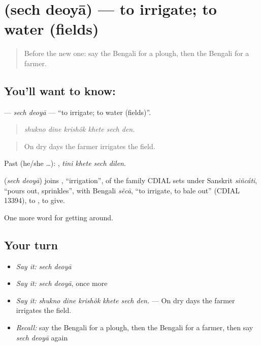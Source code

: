 \section[\texorpdfstring{\bn{সেচ} \bn{দেওয়া} (sech deoyā)}{সেচ দেওয়া (sech deoyā)}]{  (sech deoyā) — to irrigate; to water (fields)}

\label{lesson:BN-C430-sech-deoya}



\begin{quote}
Before the new one: say the Bengali for a plough, then the Bengali for a farmer.
\end{quote}

\subsection*{You'll want to know:  }
\textbf{ } — \emph{sech deoyā} — \textquotedblleft{}to irrigate; to water (fields)\textquotedblright{}.

\begin{quote}
     
\end{quote}

\begin{quote}
\emph{shukno dine krishôk khete sech den.}
\end{quote}

\begin{quote}
On dry days the farmer irrigates the field.
\end{quote}

Past (he/she …):    , \emph{tini khete sech dilen}.

\begin{cousinweb}
\textbf{ } (\emph{sech deoyā}) joins , \textquotedblleft{}irrigation\textquotedblright{}, of the family CDIAL sets under Sanskrit \emph{siñcáti}, \textquotedblleft{}pours out, sprinkles\textquotedblright{}, with Bengali \emph{sẽcā}, \textquotedblleft{}to irrigate, to bale out\textquotedblright{} (CDIAL 13394), to , to give.
\end{cousinweb}

\begin{grammarlens}[title={What you've built}]
One more word for getting around.
\end{grammarlens}

\subsection*{Your turn}
\begin{itemize}
\raggedright
  \item \emph{Say it:} \emph{sech deoyā}
  \item \emph{Say it:} \emph{sech deoyā}, once more
  \item \emph{Say it:} \emph{shukno dine krishôk khete sech den.} — On dry days the farmer irrigates the field.
  \item \emph{Recall:} say the Bengali for a plough, then the Bengali for a farmer, then say \emph{sech deoyā} again
\end{itemize}


